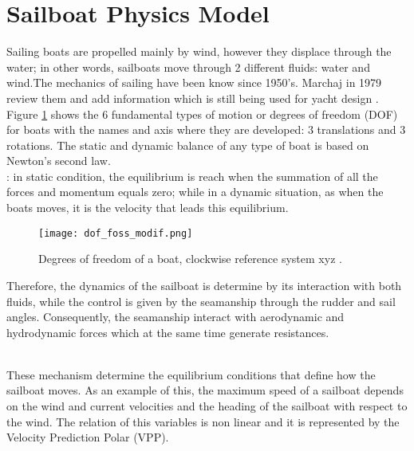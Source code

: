 \section {Sailboat Physics Model} \label{sailphysics}
Sailing boats are propelled mainly by wind, however they displace through the water; in other words, sailboats move through 2 different fluids: water and wind.The mechanics of sailing have been know since 1950's.  Marchaj in 1979 review them and add information which is still being used for yacht design \cite{marchajaereo1979}. Figure \ref{DOF} shows the 6 fundamental types of motion or degrees of freedom (DOF) for boats with the names and axis where they are developed: 3 translations and 3 rotations.  
The static and dynamic balance of any type of boat is based on Newton's second law. \\
:  in static condition, the equilibrium is reach when the summation of all the forces and momentum equals zero; while in a dynamic situation, as when the boats moves, it is the velocity that leads this equilibrium.
\begin{figure}[ht]
\centering
  \texttt{[image: dof\_foss\_modif.png]}
 \caption{Degrees of freedom of a boat, clockwise reference system xyz \cite{fossati2009aero}. }
\label{DOF}
\end{figure}
Therefore, the dynamics of the sailboat is determine by its interaction with both fluids, while the control is given by the seamanship through the rudder and sail angles. Consequently, the seamanship interact with aerodynamic and hydrodynamic forces which at the same time generate resistances.

\\
These mechanism determine the equilibrium conditions that define how the sailboat moves\cite{fossati2009aero}.  As an example of this, the maximum speed of a sailboat depends on the wind and current velocities and the heading of the sailboat with respect to the wind. The relation of this variables is non linear and it is represented by the Velocity Prediction Polar (VPP).\par

